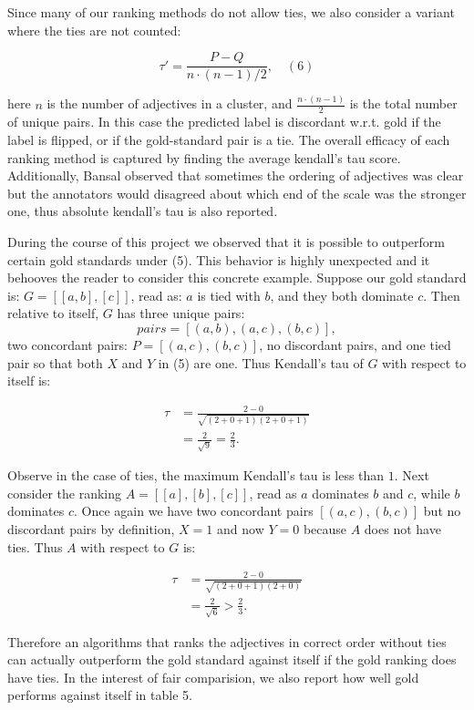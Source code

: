Since many of our ranking methods do not allow ties, we also consider a variant where the ties are not counted:

\[
  \tau' = \frac{ P - Q }{n \cdot (n-1)/ 2 }, \quad (6)
\]

here $n$ is the number of adjectives in a cluster, and $\frac{n \cdot (n-1)}{2}$ is the total number of unique pairs. In this case the predicted label is discordant w.r.t. gold if the label is flipped, or if the gold-standard pair is a tie. The overall efficacy of each ranking method is captured by finding the average kendall's tau score. Additionally, Bansal observed that sometimes the ordering of adjectives was clear but the annotators would disagreed about which end of the scale was the stronger one, thus absolute kendall's tau is also reported.

During the course of this project we observed that it is possible to outperform certain gold standards under (5). This behavior is highly unexpected and it behooves the reader to consider this concrete example. Suppose our gold standard is: $G = [[a,b],[c]]$, read as: $a$ is tied with $b$, and they both dominate $c$. Then relative to itself, $G$ has three unique pairs:
\[
  pairs = [(a,b),(a,c),(b,c)],
\]
two concordant pairs: $P = [(a,c),(b,c)]$, no discordant pairs, and one tied pair so that both $X$ and $Y$ in (5) are one. Thus Kendall's tau of $G$ with respect to itself is:

\begin{align*}
  \tau &= \frac{2 - 0}{\sqrt{(2 + 0 + 1)(2 + 0 + 1)}} \\
     &= \frac{2}{\sqrt{9}} = \frac{2}{3}.
\end{align*}

Observe in the case of ties, the maximum Kendall's tau is less than $1$. Next consider the ranking $A = [[a],[b],[c]]$, read as $a$ dominates $b$ and $c$, while $b$ dominates $c$. Once again we have two concordant pairs $[(a,c),(b,c)]$ but no discordant pairs by definition, $X = 1$ and now $Y = 0$ because $A$ does not have ties. Thus $A$ with respect to $G$ is:

\begin{align*}
  \tau &= \frac{2 - 0}{\sqrt{(2 + 0 + 1)(2 + 0)}} \\
     &= \frac{2}{\sqrt{6}} > \frac{2}{3}.
\end{align*}

Therefore an algorithms that ranks the adjectives in correct order without ties can actually outperform the gold standard against itself if the gold ranking does have ties. In the interest of fair comparision, we also report how well gold performs against itself in table 5.


